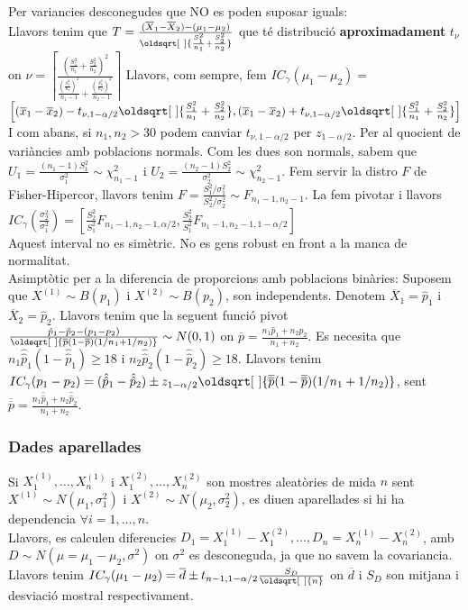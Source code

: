 \documentclass[a4paper]{sciposter}
\renewcommand*{\sqrt}[2][\ ]{\oldsqrt[#1]{#2} }
\begin{document}
\begin{multicols}{3}
Per variancies desconegudes que NO es poden suposar iguals:\\
Llavors tenim que $T = \frac{(\overline{X}_1 - \overline{X}_2) - (\mu_1 - \mu_2)}{\sqrt{\frac{S_1^2}{n_1} + \frac{S_2^2}{n_2}}}$ que té distribució \textbf{aproximadament} $t_\nu$ on $\nu = \left\lceil\frac{\left(\frac{S^2_1}{n_1}+\frac{S_2^2}{n_2}\right)^2}{\frac{\left(\frac{S^2_1}{n_1}\right)^2}{n_1-1}+\frac{\left(\frac{S^2_2}{n_2}\right)^2}{n_2-1}}\right\rceil$ %
Llavors, com sempre, fem $IC_\gamma(\mu_1 - \mu_2) =$\\$\left[(\overline{x}_1 - \overline{x}_2) - t_{\nu, 1-\alpha/2}\sqrt{\frac{S_1^2}{n_1} + \frac{S_2^2}{n_2}},(\overline{x}_1 - \overline{x}_2) + t_{\nu, 1-\alpha/2}\sqrt{\frac{S_1^2}{n_1} + \frac{S_2^2}{n_2}}\right]$\\
I com abans, si $n_1, n_2 > 30$ podem canviar $t_{\nu, 1-\alpha/2}$ per $z_{1-\alpha/2}$.
Per al quocient de variàncies amb poblacions normals. Com les dues son normals, sabem que $U_1 = \frac{(n_1-1)S_1^2}{\sigma^2_1} \sim \chi^2_{n_1-1}$ i $U_2 = \frac{(n_2-1)S_2^2}{\sigma^2_2} \sim \chi^2_{n_2-1}$. Fem servir la distro $F$ de Fisher-Hipercor, llavors tenim $F = \frac{S_1^2/\sigma^2_1}{S_2^2/\sigma^2_2} \sim F_{n_1-1,n_2-1}$. La fem pivotar i llavors $IC_\gamma(\frac{\sigma_2^2}{\sigma_1^2}) = \left[\frac{S_2^2}{S_1^2}F_{n_1-1,n_2-1,\alpha/2},\frac{S_2^2}{S_1^2}F_{n_1-1,n_2-1,1-\alpha/2}\right]$\\
Aquest interval no es simètric. No es gens robust en front a la manca de normalitat.\\
Asimptòtic per a la diferencia de proporcions amb poblacions binàries:
Suposem que $X^{(1)} \sim B(p_1)$ i $X^{(2)} \sim B(p_2)$, son independents. Denotem $\overline{X}_1 = \hat{p}_1$ i $\overline{X}_2 = \hat{p}_2$. Llavors tenim que la seguent funció pivot $\frac{\hat{p}_1 - \hat{p}_2 - (p_1 - p_2)}{\sqrt{\overline{p}(1-\overline{p})(1/n_1 + 1/n_2)}} \sim N(0,1)$ on $\overline{p} = \frac{n_1\hat{p}_1 + n_2\hat{p}_2}{n_1 + n_2}$. Es necesita que $n_1\hat{\hat{p}}_1(1-\hat{\hat{p}}_1) \geq 18$ i $n_2\hat{\hat{p}}_2(1-\hat{\hat{p}}_2) \geq 18$.
Llavors tenim $IC_\gamma(p_1 - p_2) = (\hat{\hat{p}}_1 - \hat{\hat{p}}_2) \pm z_{1-\alpha/2}\sqrt{\overline{\overline{p}}(1-\overline{\overline{p}})(1/n_1 + 1/n_2)}$, sent $\overline{\overline{p}} = \frac{n_1\hat{\hat{p}}_1 + n_2\hat{\hat{p}}_2}{n_1 + n_2}$.
\subsubsection{Dades aparellades}
Si $X_1^{(1)},\dots,X_n^{(1)}$ i $X_1^{(2)},\dots,X_n^{(2)}$ son mostres aleatòries de mida $n$ sent $X^{(1)} \sim N(\mu_1,\sigma_1^2)$ i $X^{(2)} \sim N(\mu_2,\sigma_2^2)$, es diuen aparellades si hi ha dependencia $\forall i = 1,\dots,n$.\\
Llavors, es calculen diferencies $D_1 = X_1^{(1)} - X_1^{(2)},\dots,D_n = X_n^{(1)} - X_n^{(2)}$, amb $D \sim N(\mu = \mu_1-\mu_2, \sigma^2)$ on $\sigma^2$ es desconeguda, ja que no savem la covariancia.\\
Llavors tenim $IC_\gamma(\mu_1 - \mu_2) = \overline{d} \pm t_{n-1,1-\alpha/2}\frac{S_D}{\sqrt{n}}$ on $\overline{d}$ i $S_D$ son mitjana i desviació mostral respectivament.

\end{multicols}
\end{document}
